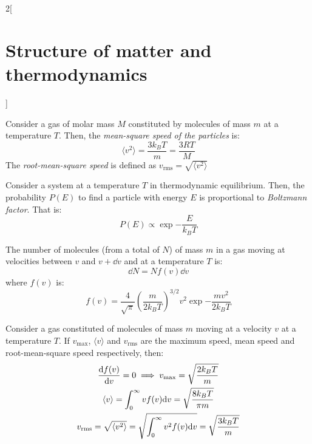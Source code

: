 \documentclass[../../../main.tex]{subfiles}
\begin{document}
\begin{multicols}{2}[\section{Structure of matter and thermodynamics}]
\begin{prop}
    \end{prop}
    \begin{prop}
        Consider a gas of molar mass $M$ constituted by molecules of mass $m$ at a temperature $T$. Then, the \textit{mean-square speed of the particles} is: $$\langle v^2\rangle=\frac{3 k_B T}{m}=\frac{3 R T}{M}$$
        The \textit{root-mean-square speed} is defined as $v_\text{rms}=\sqrt{\langle v^2\rangle}$
    \end{prop}
    \begin{prop}
        Consider a system at a temperature $T$ in thermodynamic equilibrium. Then, the probability $P(E)$ to find a particle with energy $E$ is proportional to \textit{Boltzmann factor}. That is:
        $$P(E)\propto\exp{-\frac{E}{k_BT}}$$
    \end{prop}
    \begin{prop}
        The number of molecules (from a total of $N$) of mass $m$ in a gas moving at velocities between $v$ and $v+\dd v$ and at a temperature $T$ is:
        $$\dd N=Nf(v)\dd v$$ where $f(v)$ is: $$f(v)=\frac{4}{\sqrt{\pi}}{\left(\frac{m}{2k_BT}\right)}^{3/2}v^2\exp{-\frac{mv^2}{2k_BT}}$$
    \end{prop}
    \begin{prop}
        Consider a gas constituted of molecules of mass $m$ moving at a velocity $v$ at a temperature $T$. If $v_\text{max}$, $\langle v\rangle$ and $v_\text{rms}$ are the maximum speed, mean speed and root-mean-square speed respectively, then:
        \begin{gather*}
            \dv{f(v)}{v}=0\implies v_\text{max}=\sqrt{\frac{2k_BT}{m}}\\
            \langle v\rangle=\int_0^\infty vf(v)\dd v=\sqrt{\frac{8k_BT}{\pi m}}\\
            v_\text{rms}=\sqrt{\langle v^2\rangle}=\sqrt{\int_0^\infty v^2f(v)\dd v}=\sqrt{\frac{3k_BT}{m}}
        \end{gather*}
    \end{prop}

\end{multicols}
\end{document}
